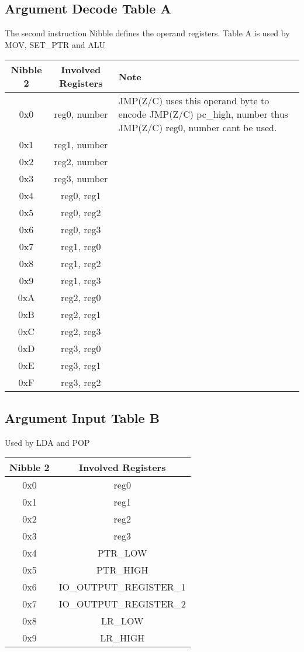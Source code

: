 \documentclass[a4paper, 12pt]{article}
\begin{document}
	\subsection{Argument Decode Table A}
	The second instruction Nibble defines the operand registers.
	Table A is used by MOV, SET\_PTR and ALU
	\begin{center}
		\begin{tabular}{|c|c|p{6cm}|}
			\hline
			Nibble 2 & Involved Registers & Note \\ \hline
			0x0 & reg0, number & JMP(Z/C) uses this operand byte to encode JMP(Z/C) pc\_high, number thus JMP(Z/C) reg0, number cant be used. \\ \hline
			0x1 & reg1, number & \\ \hline
			0x2 & reg2, number & \\ \hline
			0x3 & reg3, number & \\ \hline
			0x4 & reg0, reg1 & \\ \hline
			0x5 & reg0, reg2 & \\ \hline
			0x6 & reg0, reg3 & \\ \hline
			0x7 & reg1, reg0 & \\ \hline
			0x8 & reg1, reg2 & \\ \hline
			0x9 & reg1, reg3 & \\ \hline
			0xA & reg2, reg0 & \\ \hline
			0xB & reg2, reg1 & \\ \hline
			0xC & reg2, reg3 & \\ \hline
			0xD & reg3, reg0 & \\ \hline
			0xE & reg3, reg1 & \\ \hline
			0xF & reg3, reg2 & \\ \hline
		\end{tabular}
	\end{center}	
	\newpage
	\subsection{Argument Input Table B}
	Used by LDA and POP
	\begin{center}
		\begin{tabular}{|c|c|}
			\hline
			Nibble 2 & Involved Registers \\ \hline
			0x0 & reg0 \\ \hline
			0x1 & reg1 \\ \hline
			0x2 & reg2 \\ \hline
			0x3 & reg3 \\ \hline
			0x4 & PTR\_LOW \\ \hline
			0x5 & PTR\_HIGH \\ \hline
			0x6 & IO\_OUTPUT\_REGISTER\_1 \\ \hline
			0x7 & IO\_OUTPUT\_REGISTER\_2 \\ \hline
			0x8 & LR\_LOW \\ \hline
			0x9 & LR\_HIGH \\ \hline
		\end{tabular}
	\end{center}	
\end{document}
